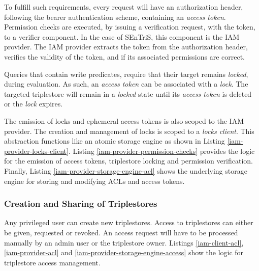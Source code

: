 To fulfill such requirements, every request will have an authorization header, following the bearer authentication scheme, containing an \emph{access token}. Permission checks are executed, by issuing a verification request, with the token, to a verifier component. In the case of \gls{SEnTriS}, this component is the \gls{IAM} provider. The \gls{IAM} provider extracts the token from the authorization header, verifies the validity of the token, and if its associated permissions are correct.

Queries that contain write predicates, require that their target remains \emph{locked}, during evaluation. As such, an \emph{access token} can be associated with a \emph{lock}. The targeted triplestore will remain in a \emph{locked} state until its \emph{access token} is deleted or the \emph{lock} expires.

The emission of locks and ephemeral access tokens is also scoped to the IAM provider. The creation and management of locks is scoped to a \emph{locks client}. This abstraction functions like an atomic storage engine as shown in Listing \ref{iam-provider-locks-client}. Listing \ref{iam-provider-permission-checks} provides the logic for the emission of access tokens, triplestore locking and permission verification. Finally, Listing \ref{iam-provider-storage-engine-acl} shows the underlying storage engine for storing and modifying \gls{ACL}s and access tokens.

%

%

%

\subsubsection{Creation and Sharing of Triplestores} Any privileged user can create new triplestores. Access to triplestores can either be given, requested or revoked. An access request will have to be processed manually by an admin user or the triplestore owner. Listings \ref{iam-client-acl}, \ref{iam-provider-acl} and \ref{iam-provider-storage-engine-access} show the logic for triplestore access management.


